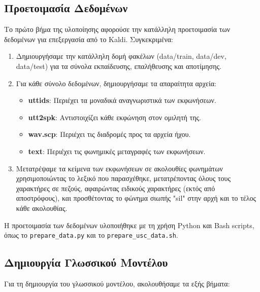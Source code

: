 \documentclass[a4paper,12pt]{article}
\begin{document}
\subsection{Προετοιμασία Δεδομένων}

Το πρώτο βήμα της υλοποίησης αφορούσε την κατάλληλη προετοιμασία των δεδομένων για επεξεργασία από το Kaldi. Συγκεκριμένα:

\begin{enumerate}
    \item Δημιουργήσαμε την κατάλληλη δομή φακέλων (data/train, data/dev, data/test) για τα σύνολα εκπαίδευσης, επαλήθευσης και αποτίμησης.
    
    \item Για κάθε σύνολο δεδομένων, δημιουργήσαμε τα απαραίτητα αρχεία:
    \begin{itemize}
        \item \textbf{uttids}: Περιέχει τα μοναδικά αναγνωριστικά των εκφωνήσεων.
        \item \textbf{utt2spk}: Αντιστοιχίζει κάθε εκφώνηση στον ομιλητή της.
        \item \textbf{wav.scp}: Περιέχει τις διαδρομές προς τα αρχεία ήχου.
        \item \textbf{text}: Περιέχει τις φωνημικές μεταγραφές των εκφωνήσεων.
    \end{itemize}
    
    \item Μετατρέψαμε τα κείμενα των εκφωνήσεων σε ακολουθίες φωνημάτων χρησιμοποιώντας το λεξικό που παρασχέθηκε, μετατρέποντας όλους τους χαρακτήρες σε πεζούς, αφαιρώντας ειδικούς χαρακτήρες (εκτός από αποστρόφους), και προσθέτοντας το φώνημα σιωπής "sil" στην αρχή και το τέλος κάθε ακολουθίας.
\end{enumerate}

Η προετοιμασία των δεδομένων υλοποιήθηκε με τη χρήση Python και Bash scripts, όπως το \texttt{prepare\_data.py} και το \texttt{prepare\_usc\_data.sh}.

\subsection{Δημιουργία Γλωσσικού Μοντέλου}

Για τη δημιουργία του γλωσσικού μοντέλου, ακολουθήσαμε τα εξής βήματα:
\end{document}
